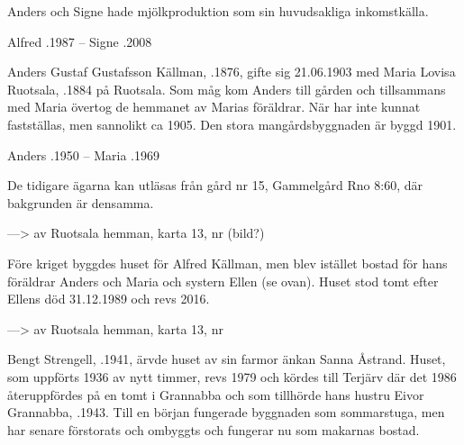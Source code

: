 Anders och Signe hade mjölkproduktion som sin huvudsakliga inkomstkälla.
\begin{jhchildren}
  \item {}
  \item {}
\end{jhchildren}
Alfred .1987  --  Signe .2008


Anders Gustaf Gustafsson Källman, .1876, gifte sig 21.06.1903 med Maria Lovisa Ruotsala, .1884 på Ruotsala. Som måg kom Anders till gården och tillsammans med Maria övertog de hemmanet av Marias föräldrar. När har inte kunnat fastställas, men sannolikt ca 1905. Den stora mangårdsbyggnaden är byggd 1901.
\begin{jhchildren}
  \item {}
  \item {}
  \item {}
  \item {}
  \item {}
  \item {}
  \item {}
\end{jhchildren}
Anders .1950  --  Maria .1969

De tidigare ägarna kan utläsas från gård nr 15, Gammelgård Rno 8:60, där bakgrunden är densamma.


--->  av Ruotsala hemman, karta 13, nr         (bild?)


Före kriget byggdes huset för Alfred Källman, men blev istället bostad för hans föräldrar Anders och Maria och systern Ellen (se ovan). Huset stod tomt efter Ellens död 31.12.1989 och revs 2016.



--->  av Ruotsala hemman, karta 13, nr 


Bengt Strengell, .1941, ärvde huset av sin farmor änkan Sanna Åstrand. Huset, som uppförts 1936 av nytt timmer, revs 1979 och kördes till Terjärv där det 1986 återuppfördes på en tomt i Grannabba och som tillhörde hans hustru Eivor Grannabba, .1943. Till en början fungerade byggnaden som sommarstuga, men har senare förstorats och ombyggts och fungerar nu som makarnas bostad.

